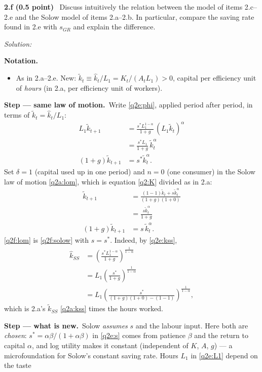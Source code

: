 \documentclass[11pt,a4paper]{article}
\newif\ifsolucoes
\newcommand{\sub}[2]{\Needspace{8\baselineskip}\par\medskip\noindent\textbf{#1 (#2)}~}
\newcommand{\resolespaco}[1][6cm]{\ifsolucoes\else\par\textit{Solution:}\vspace{#1}\par\fi}
\newcommand{\passo}[2]{\par\smallskip\noindent\textbf{Step --- #1.}~#2}
\newenvironment{notacao}{\par\smallskip\noindent\textbf{Notation.}\begin{itemize}[leftmargin=1.4em,topsep=1pt,itemsep=0pt]\small}{\end{itemize}}
\begin{document}
\sub{2.f}{0.5 point} Discuss intuitively the relation between the model of items 2.c--2.e and the
Solow model of items 2.a--2.b. In particular, compare the saving rate found in 2.e with $s_{GR}$ and
explain the difference.
\resolespaco[5cm]
\begin{sol}
\begin{notacao}
\item As in 2.a--2.e. New: $\tilde k_t\equiv\hat k_t/L_1=K_t/(A_tL_1)>0$, capital per efficiency unit
of \emph{hours} (in 2.a, per efficiency unit of workers).
\end{notacao}
\passo{same law of motion}{Write \eqref{q2e:phi}, applied period after period, in terms of
$\tilde k_t=\hat k_t/L_1$:}
\begin{align}
L_1\tilde k_{t+1} &= \frac{s^\ast L_1^{1-\alpha}}{1+g}\,(L_1\tilde k_t)^{\alpha}\nonumber\\
&= \frac{s^\ast L_1}{1+g}\,\tilde k_t^{\alpha}\nonumber\\
(1+g)\tilde k_{t+1} &= s^\ast\tilde k_t^{\alpha}. \label{q2f:lom}
\end{align}
Set $\boxed{\delta=1}$ (capital used up in one period) and $\boxed{n=0}$ (one consumer) in the
Solow law of motion \eqref{q2a:lom}, which is equation \eqref{q2:K} divided as in 2.a:
\begin{align}
\tilde k_{t+1} &= \frac{(1-1)\tilde k_t+s\tilde k_t^{\alpha}}{(1+g)(1+0)}\nonumber\\
&= \frac{s\tilde k_t^{\alpha}}{1+g}\nonumber\\
(1+g)\tilde k_{t+1} &= s\,\tilde k_t^{\alpha}. \label{q2f:solow}
\end{align}
\eqref{q2f:lom} is \eqref{q2f:solow} with $s=s^\ast$. Indeed, by \eqref{q2e:kss},
\begin{align*}
\hat k_{SS} &= \left(\frac{s^\ast L_1^{1-\alpha}}{1+g}\right)^{\frac{1}{1-\alpha}}\\
&= L_1\left(\frac{s^\ast}{1+g}\right)^{\frac{1}{1-\alpha}}\\
&= L_1\left(\frac{s^\ast}{(1+g)(1+0)-(1-1)}\right)^{\frac{1}{1-\alpha}},
\end{align*}
which is 2.a's $\tilde k_{SS}$ \eqref{q2a:kss} times the hours worked.
\passo{what is new}{Solow \emph{assumes} $s$ and the labour input. Here both are \emph{chosen}:
$s^\ast=\alpha\beta/(1+\alpha\beta)$ in \eqref{q2e:s} comes from patience $\beta$ and the return to
capital $\alpha$, and log utility makes it constant (independent of $K$, $A$, $g$) --- a
microfoundation for Solow's constant saving rate. Hours $L_1$ in \eqref{q2e:L1} depend on the taste
}
\end{sol}
\end{document}
